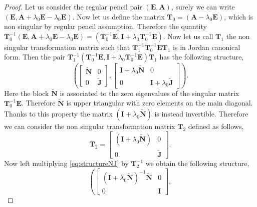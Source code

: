 		\begin{proof}
			Let us consider the regular pencil pair $(\bm{E},\bm{A})$, surely we can write $(\bm{E},\bm{A}+\lambda_{0}\bm{E}-\lambda_{0}\bm{E})$. Now let us define the matrix $\bm{T}_{0}=(\bm{A}-\lambda_{0}\bm{E})$, which is non singular by regular pencil assumption. Therefore the quantity $\bm{T}_{0}^{-1}(\bm{E},\bm{A}+\lambda_{0}\bm{E}-\lambda_{0}\bm{E}) = \left(\bm{T}_{0}^{-1}\bm{E},\bm{I}+\lambda_{0}\bm{T}_{0}^{-1}\bm{E}\right)$. Now let us call $\bm{T}_{1}$ the non singular transformation matrix such that $\bm{T}_{1}^{-1}\bm{T}_{0}^{-1}\bm{ET}_{1}$ is in Jordan canonical form. Then the pair $\bm{T}_{1}^{-1}\left(\bm{T}_{0}^{-1}\bm{E},\bm{I}+\lambda_{0}\bm{T}_{0}^{-1}\bm{E}\right)\bm{T}_{1}$ has the following structure, 
			\begin{equation}
				\label{eq:structureNJ}
				\left(
				\begin{bmatrix}
					\tilde{\bm{N}} 	& 0 \\
					0 			& \tilde{\bm{J}}
				\end{bmatrix},
				\begin{bmatrix}
					\bm{I} + \lambda_{0}\tilde{\bm{N}} 	& 0 \\
					0 							& \bm{I} + \lambda_{0}\tilde{\bm{J}}
				\end{bmatrix}
				\right).
			\end{equation}
			Here the block $\tilde{\bm{N}}$ is associated to the zero eigenvalues of the singular matrix $\bm{T}_{0}^{-1}\bm{E}$. Therefore $\tilde{\bm{N}}$ is upper triangular with zero elements on the main diagonal. Thanks to this property the matrix $(\bm{I}+\lambda_{0}\tilde{\bm{N}})$ is instead invertible. Therefore we can consider the non singular transformation matrix $\bm{T}_{2}$ defined as follows,
			\begin{equation}
				\bm{T}_{2} = 
				\begin{bmatrix}
					(\bm{I}+\lambda_{0}\tilde{\bm{N}}) & 0 \\
					0 & \tilde{\bm{J}}
				\end{bmatrix}.
			\end{equation}
			Now left multiplying \cref{eq:structureNJ} by $\bm{T}_{2}^{-1}$ we obtain the following structure,
			\begin{equation}
				\left(
					\begin{bmatrix}
						(\bm{I} + \lambda_{0}\tilde{\bm{N}})^{-1}\tilde{\bm{N}} 	& 0 \\
						0 			& \bm{I}
					\end{bmatrix},

\end{equation}
\end{proof}
